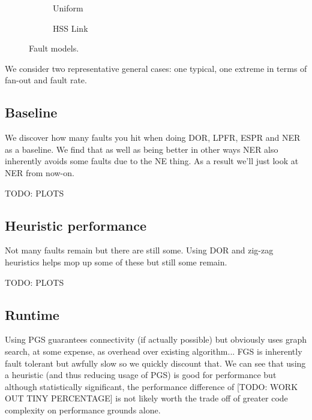 		\begin{figure}
			\center
			\begin{subfigure}{0.48\linewidth}
				\hspace*{-1.5cm}
				
				\caption{Uniform}
				\label{fig:fault-example-uniform}
			\end{subfigure}
			\begin{subfigure}{0.48\linewidth}
				\hspace*{-1.5cm}
				
				\caption{HSS Link}
				\label{fig:fault-example-hss}
			\end{subfigure}
			
			\caption{Fault models.}
			\label{fig:fault-example}
		\end{figure}
		
		We consider two representative general cases: one typical, one extreme in
		terms of fan-out and fault rate.
		
		\subsection{Baseline}
		
			We discover how many faults you hit when doing DOR, LPFR, ESPR and NER
			as a baseline. We find that as well as being better in other ways NER
			also inherently avoids some faults due to the NE thing. As a result
			we'll just look at NER from now-on.
			
			TODO: PLOTS
		
		\subsection{Heuristic performance}
			
			Not many faults remain but there are still some. Using DOR and zig-zag
			heuristics helps mop up some of these but still some remain.
			
			TODO: PLOTS
		
		\subsection{Runtime}
			
			Using PGS guarantees connectivity (if actually possible) but obviously
			uses graph search, at some expense, as overhead over existing
			algorithm... FGS is inherently fault tolerant but awfully slow so we
			quickly discount that. We can see that using a heuristic (and thus
			reducing usage of PGS) is good for performance but although
			statistically significant, the performance difference of [TODO: WORK OUT
			TINY PERCENTAGE] is not likely worth the trade off of greater code
			complexity on performance grounds alone.
			
